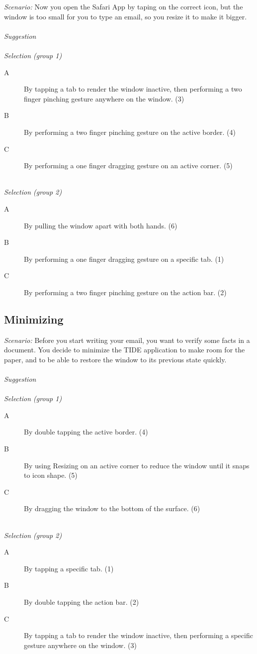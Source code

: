 \emph{Scenario:}
Now you open the Safari App by taping on the correct icon, but the window is too small for you to type an email, so you resize it to make it bigger.
\hfill\\
\hfill\\
\emph{Suggestion}
\hfill\\
\hfill\\
\emph{Selection (group 1)}
\begin{description}
\item[A]{By tapping a tab to render the window inactive, then performing a two finger pinching gesture anywhere on the window. (3)}
\item[B]{By performing a two finger pinching gesture on the active border. (4)}
\item[C]{By performing a one finger dragging gesture on an active corner. (5)}
\end{description}
\hfill\\
\emph{Selection (group 2)}
\begin{description}
\item[A]{By pulling the window apart with both hands. (6)}
\item[B]{By performing a one finger dragging gesture on a specific tab. (1)}
\item[C]{By performing a two finger pinching gesture on the action bar. (2)}
\end{description}



\subsection{Minimizing}

\emph{Scenario:}
Before you start writing your email, you want to verify some facts in a document.
You decide to minimize the TIDE application to make room for the paper, and to be able to restore the window to its previous state quickly.
\hfill\\
\hfill\\
\emph{Suggestion}
\hfill\\
\hfill\\
\emph{Selection (group 1)}
\begin{description}
\item[A]{By double tapping the active border. (4)}
\item[B]{By using Resizing on an active corner to reduce the window until it snaps to icon shape. (5)}
\item[C]{By dragging the window to the bottom of the surface. (6)}
\end{description}
\hfill\\
\emph{Selection (group 2)}
\begin{description}
\item[A]{By tapping a specific tab. (1)}
\item[B]{By double tapping the action bar. (2)}
\item[C]{By tapping a tab to render the window inactive, then performing a specific gesture anywhere on the window. (3)}
\end{description}

